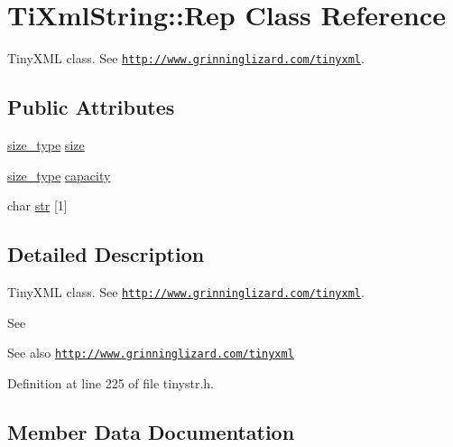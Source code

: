\hypertarget{struct_ti_xml_string_1_1_rep}{}\section{Ti\+Xml\+String\+:\+:Rep Class Reference}
\label{struct_ti_xml_string_1_1_rep}


Tiny\+X\+ML class. See \href{http://www.grinninglizard.com/tinyxml}{\tt http\+://www.\+grinninglizard.\+com/tinyxml}.  


\subsection*{Public Attributes}
\begin{DoxyCompactItemize}
\item 
\hyperlink{class_ti_xml_string_abeb2c1893a04c17904f7c06546d0b971}{size\+\_\+type} \hyperlink{struct_ti_xml_string_1_1_rep_a3470330fe806a575dbb5909a1b908ac1}{size}
\item 
\hyperlink{class_ti_xml_string_abeb2c1893a04c17904f7c06546d0b971}{size\+\_\+type} \hyperlink{struct_ti_xml_string_1_1_rep_a9f38da318212f4a2f6ebe0afdbfaf477}{capacity}
\item 
char \hyperlink{struct_ti_xml_string_1_1_rep_a88a7037a489827ec9e59b008e11342b0}{str} \mbox{[}1\mbox{]}
\end{DoxyCompactItemize}


\subsection{Detailed Description}
Tiny\+X\+ML class. See \href{http://www.grinninglizard.com/tinyxml}{\tt http\+://www.\+grinninglizard.\+com/tinyxml}. 

See \begin{DoxySeeAlso}{See also}
\href{http://www.grinninglizard.com/tinyxml}{\tt http\+://www.\+grinninglizard.\+com/tinyxml} 
\end{DoxySeeAlso}


Definition at line 225 of file tinystr.\+h.



\subsection{Member Data Documentation}
\hypertarget{struct_ti_xml_string_1_1_rep_a9f38da318212f4a2f6ebe0afdbfaf477}{}\label{struct_ti_xml_string_1_1_rep_a9f38da318212f4a2f6ebe0afdbfaf477} 
